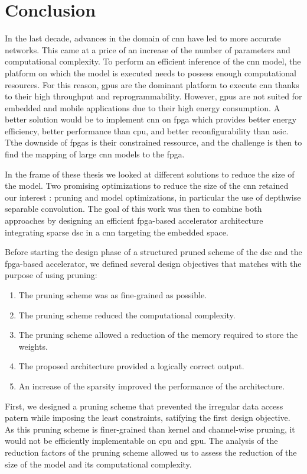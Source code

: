 \chapter*{Conclusion}
%
In the last decade, advances in the domain of \acrshort{cnn} have led to more accurate networks. This came at a price of an increase of the number of parameters and computational complexity. To perform an efficient inference of the \acrshort{cnn} model, the platform on which the model is executed needs to possess enough computational resources. For this reason, \acrshort{gpu}s are the dominant platform to execute \acrshort{cnn} thanks to their high throughput and reprogrammability. However, \acrshort{gpu}s are not suited for embedded and mobile applications due to their high energy consumption. A better solution would be to implement \acrshort{cnn} on \acrshort{fpga} which provides better energy efficiency, better performance than \acrshort{cpu}, and better reconfigurability than \acrshort{asic}. Tthe downside of \acrshort{fpga}s is their constrained ressource, and the challenge is then to find the mapping of large \acrshort{cnn} models to the \acrshort{fpga}.

In the frame of these thesis we looked at different solutions to reduce the size of the model. Two promising optimizations to reduce the size of the \acrshort{cnn} retained our interest : pruning and model optimizations, in particular the use of depthwise separable convolution. The goal of this work was then to combine both approaches by designing an efficient \acrshort{fpga}-based accelerator architecture integrating sparse \acrshort{dsc} in a \acrshort{cnn} targeting the embedded space.

Before starting the design phase of a structured pruned scheme of the \acrshort{dsc} and the \acrshort{fpga}-based accelerator, we defined several design objectives that matches with the purpose of using pruning:
%
\begin{enumerate}
    \item The pruning scheme was as fine-grained as possible.
    \item The pruning scheme reduced the computational complexity.
    \item The pruning scheme allowed a reduction of the memory required to store the weights.
    \item The proposed architecture provided a logically correct output.
    \item An increase of the sparsity improved the performance of the architecture.
\end{enumerate}
%
First, we designed a pruning scheme that prevented the irregular data access patern while imposing the least constraints, satifying the first design objective. As this pruning scheme is finer-grained than kernel and channel-wise pruning, it would not be efficiently implementable on \acrshort{cpu} and \acrshort{gpu}. The analysis of the reduction factors of the pruning scheme allowed us to assess the reduction of the size of the model and its computational complexity.

